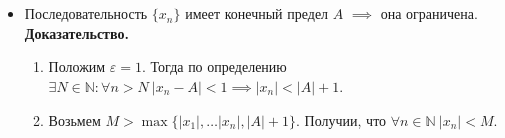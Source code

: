 \documentclass{article}
\begin{document}
\section{\centering}
\noindent{}
\begin{itemize}
    \item Последовательность \(\{x_n\}\) имеет конечный предел \(A\) \(\implies\) она ограничена.\\
    \textbf{Доказательство.}
    \begin{enumerate}
        \item Положим \(\varepsilon = 1\). Тогда по определению \(\exists N \in \mathbb{N}: \forall n > N\ \left\vert x_n - A \right\vert < 1 \implies \left\vert x_n \right\vert < \left\vert A \right\vert + 1 \).
        \item Возьмем \(M > \max\{\left\vert x_1 \right\vert, \dots \left\vert x_n \right\vert, \left\vert A \right\vert + 1\}\). Получии, что \(\forall n \in \mathbb{N}\ \left\vert x_n \right\vert < M\).  
    \end{enumerate}
\end{itemize}
\end{document}
